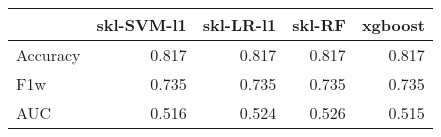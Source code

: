 \begin{tabular}{lrrrr}
\toprule
{} &  skl-SVM-l1 &  skl-LR-l1 &  skl-RF &  xgboost \\
\midrule
Accuracy &       0.817 &      0.817 &   0.817 &    0.817 \\
F1w      &       0.735 &      0.735 &   0.735 &    0.735 \\
AUC      &       0.516 &      0.524 &   0.526 &    0.515 \\
\bottomrule
\end{tabular}

